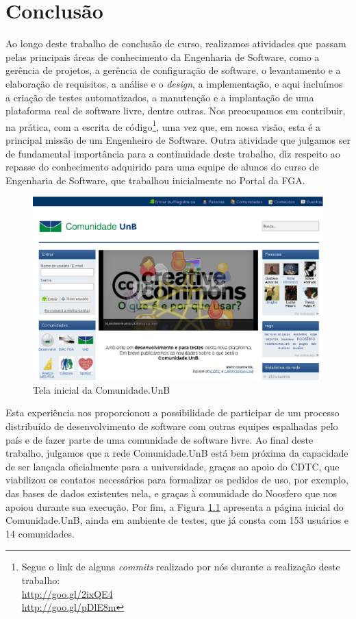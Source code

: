 \chapter{Conclusão}
\label{cap:conclusao}

Ao longo deste trabalho de conclusão de curso, realizamos atividades que passam
pelas principais áreas de conhecimento da Engenharia de Software, como a
gerência de projetos, a gerência de configuração de software,
o levantamento e a elaboração de requisitos, a análise e o \textit{design},
a implementação, e aqui incluímos a criação de testes automatizados,
a manutenção e a implantação de uma plataforma real de software livre, dentre
outras.
%
Nos preocupamos em contribuir, na prática, com a escrita de código\footnote{%
Segue o link de alguns \textit{commits} realizado por nós durante a realização
deste trabalho: \\
\url{http://goo.gl/2ixQE4}\\
\url{http://goo.gl/pDlE8m}},
uma vez que, em nossa visão, esta é a principal missão de um Engenheiro de
Software.
%
Outra atividade que julgamos ser de fundamental importância para a continuidade
deste trabalho, diz respeito ao repasse do conhecimento adquirido para uma
equipe de alunos do curso de Engenharia de Software, que trabalhou inicialmente
no Portal da FGA.


\begin{figure}[h!]
	\centering
	\includegraphics[keepaspectratio=true,scale=0.45]
	  {figuras/comunidade-unb.eps}
	\caption{Tela inicial da Comunidade.UnB}
	\label{homepage:comunidade.unb}
\end{figure}

Esta experiência nos proporcionou a possibilidade de participar de um processo
distribuído de desenvolvimento de software com outras equipes espalhadas pelo
país e de fazer parte de uma comunidade de software livre.
%
Ao final deste trabalho, julgamos que a rede Comunidade.UnB está bem próxima
da capacidade de ser lançada oficialmente para a universidade, graças ao
apoio do CDTC, que viabilizou os contatos necessários para formalizar os
pedidos de uso, por exemplo, das bases de dados existentes nela, e graças
à comunidade do Noosfero que nos apoiou durante sua execução.
%
Por fim, a Figura \ref{homepage:comunidade.unb} apresenta a página inicial do
Comunidade.UnB, ainda em ambiente de testes, que já consta com 153 usuários
e 14 comunidades.

